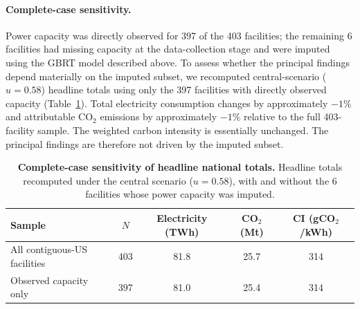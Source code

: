 \documentclass[12pt]{article}
\begin{document}
\paragraph{Complete-case sensitivity.}
Power capacity was directly observed for 397 of the 403 facilities; the
remaining 6 facilities had missing capacity at the data-collection stage
and were imputed using the GBRT model described above. To assess whether
the principal findings depend materially on the imputed subset, we
recomputed central-scenario ($u = 0.58$) headline totals using only the
397 facilities with directly observed capacity
(Table~\ref{tab:complete_case_sensitivity}). Total electricity consumption
changes by approximately $-1\%$ and attributable CO$_2$ emissions by
approximately $-1\%$ relative to the full 403-facility sample. The
weighted carbon intensity is essentially unchanged. The principal findings
are therefore not driven by the imputed subset.

\begin{table}[H]
\centering
\caption{\textbf{Complete-case sensitivity of headline national totals.}
Headline totals recomputed under the central scenario ($u=0.58$), with
and without the 6 facilities whose power capacity was imputed.}
\label{tab:complete_case_sensitivity}
\begin{tabular}{lcccc}
\toprule
Sample & $N$ & Electricity (TWh) & CO$_2$ (Mt) & CI (gCO$_2$/kWh) \\
\midrule
All contiguous-US facilities & 403 & 81.8 & 25.7 & 314 \\
Observed capacity only       & 397 & 81.0 & 25.4 & 314 \\
\bottomrule
\end{tabular}
\end{table}
\end{document}
